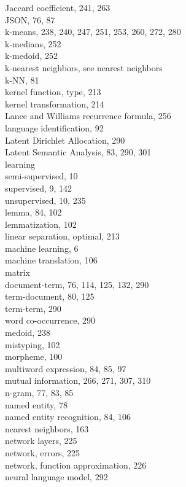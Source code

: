 \documentclass[10pt]{book}
\begin{document}
Jaccard coefficient, 241, 263\\
JSON, 76, 87\\
k-means, 238, 240, 247, 251, 253, 260, 272, 280\\
k-medians, 252\\
k-medoid, 252\\
k-nearest neighbors, see nearest neighbors\\
k-NN, 81\\
kernel function, type, 213\\
kernel transformation, 214\\
Lance and Williams recurrence formula, 256\\
language identification, 92\\
Latent Dirichlet Allocation, 290\\
Latent Semantic Analysis, 83, 290, 301\\
learning\\
semi-supervised, 10\\
supervised, 9, 142\\
unsupervised, 10, 235\\
lemma, 84, 102\\
lemmatization, 102\\
linear separation, optimal, 213\\
machine learning, 6\\
machine translation, 106\\
matrix\\
document-term, 76, 114, 125, 132, 290\\
term-document, 80, 125\\
term-term, 290\\
word co-occurrence, 290\\
medoid, 238\\
mistyping, 102\\
morpheme, 100\\
multiword expression, 84, 85, 97\\
mutual information, 266, 271, 307, 310\\
n-gram, 77, 83, 85\\
named entity, 78\\
named entity recognition, 84, 106\\
nearest neighbors, 163\\
network layers, 225\\
network, errors, 225\\
network, function approximation, 226\\
neural language model, 292\\
\end{document}
